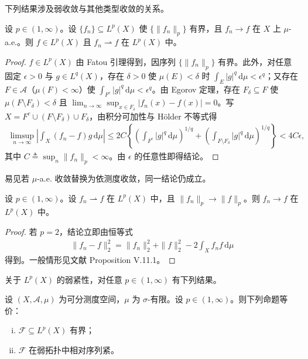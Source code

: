 \documentclass[../../main.tex]{subfiles}%
\begin{document}
下列结果涉及弱收敛与其他类型收敛的关系。

\begin{proposition}\label{proposition:ch02-有界a.e.弱收敛}
设 $p\in(1,\infty)$。设 $\{f_n\}\subseteq L^p(X)$ 使 $\{\|f_n\|_p\}$ 有界，且 $f_n\to f$ 在 $X$ 上 $\mu$-a.e.。则 $f\in L^p(X)$ 且 $f_n\rightharpoonup f$ 在 $L^p(X)$ 中。
\end{proposition}

\begin{proof}
$f\in L^p(X)$ 由 Fatou 引理得到，因序列 $\{\|f_n\|_p\}$ 有界。此外，对任意固定 $\epsilon>0$ 与 $g\in L^q(X)$，存在 $\delta>0$ 使 $\mu(E)<\delta$ 时 $\int_E|g|^q\,\mathrm{d}\mu<\epsilon^q$；又存在 $F\in\mathscr A$（$\mu(F)<\infty$）使 $\int_{F^c}|g|^q\,\mathrm{d}\mu<\epsilon^q$。由 Egorov 定理，存在 $F_\delta\subseteq F$ 使 $\mu(F\setminus F_\delta)<\delta$ 且 $\lim_{n\to\infty}\sup_{x\in F_\delta}|f_n(x)-f(x)|=0$。写 $X=F^c\cup(F\setminus F_\delta)\cup F_\delta$，由积分可加性与 H\"older 不等式得
\begin{align*}
\limsup_{n\to\infty}\left|\int_X(f_n-f)g\,\mathrm{d}\mu\right|
\leqslant 2C\left\{\left(\int_{F^c}|g|^q\,\mathrm{d}\mu\right)^{1/q}
+\left(\int_{F\setminus F_\delta}|g|^q\,\mathrm{d}\mu\right)^{1/q}\right\}<4C\epsilon,
\end{align*}
其中 $C\triangleq \sup_n\|f_n\|_p<\infty$。由 $\epsilon$ 的任意性即得结论。
\end{proof}

\begin{remark}\label{remark:ch02-依测度弱收敛}
易见若 $\mu$-a.e. 收敛替换为依测度收敛，同一结论仍成立。
\end{remark}

\begin{proposition}\label{proposition:ch02-RadonRiesz}
设 $p\in(1,\infty)$。设 $f_n\rightharpoonup f$ 在 $L^p(X)$ 中，且 $\|f_n\|_p\to\|f\|_p$。则 $f_n\to f$ 在 $L^p(X)$ 中。
\end{proposition}

\begin{proof}
若 $p=2$，结论立即由恒等式
\begin{align*}
\|f_n-f\|_2^2=\|f_n\|_2^2+\|f\|_2^2-2\int_X f_nf\,\mathrm{d}\mu
\end{align*}
得到。一般情形见文献\cite{ref40} Proposition V.11.1。
\end{proof}

关于 $L^p(X)$ 的弱紧性，对任意 $p\in(1,\infty)$ 有下列结果。

\begin{theorem}\label{theorem:ch02-Lp弱紧}
设 $(X,\mathscr A,\mu)$ 为可分测度空间，$\mu$ 为 $\sigma$-有限。设 $p\in(1,\infty)$。则下列命题等价：
\begin{enumerate}[(i)]
\item $\mathscr F\subseteq L^p(X)$ 有界；
\item $\mathscr F$ 在弱拓扑中相对序列紧。
\end{enumerate}
\end{theorem}
\end{document}
